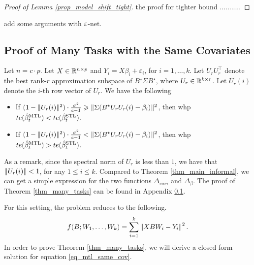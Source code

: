 \begin{proof}[Proof of Lemma \ref{prop_model_shift_tight}]
the proof for tighter bound ........... 
\end{proof}

{\cor add some arguments with ${\varepsilon}$-net.}


\subsection{Proof of Many Tasks with the Same Covariates}\label{app_proof_many_tasks}

\begin{theorem}\label{thm_many_tasks}
	Let $n = c \cdot p$.
	Let $X\in\mathbb{R}^{n\times p}$ and $Y_i = X\beta_i + \varepsilon_i$, for $i = 1,\dots,k$.
	Let $U_r U_r^{\top}$ denote the best rank-$r$ approximation subspace of $B^{\star}\Sigma B^{\star}$, where $U_r\in\mathbb{R}^{k\times r}$.
	Let $U_r(i)$ denote the $i$-th row vector of $U_r$.
	We have the following
	\begin{itemize}
		\item If $(1 - \|U_r(i)\|^2)\cdot \frac{\sigma^2}{c - 1} \geqslant \|\Sigma (B^{\star} U_r U_r(i) - \beta_i)\|^2$, then whp $te(\hat{\beta}_t^{\text{MTL}}) < te(\hat{\beta}_t^{\text{STL}})$.
		\item If $(1 - \|U_r(i)\|^2)\cdot \frac{\sigma^2}{c - 1} < \|\Sigma(B^{\star} U_r U_r(i) - \beta_i)\|^2$, then whp $te(\hat{\beta}_t^{\text{MTL}}) > te(\hat{\beta}_t^{\text{STL}})$.
	\end{itemize}
\end{theorem}
As a remark, since the spectral norm of $U_r$ is less than $1$, we have that $\|U_r(i)\| < 1$, for any $1 \le i \le k$. Compared to Theorem \ref{thm_main_informal}, we can get a simple expression for the two functions $\Delta_{vari}$ and $\Delta_{\beta}$. The proof of Theorem \ref{thm_many_tasks} can be found in Appendix \ref{app_proof_many_tasks}.




For this setting, the problem reduces to the following.
\begin{align}
	f(B; W_1, \dots, W_k) = \sum_{i=1}^k \left\| X B W_i - Y_i \right\|^2. \label{eq_mtl_same_cov}
\end{align}
In order to prove Theorem \ref{thm_many_tasks}, we will derive a closed form solution for equation \eqref{eq_mtl_same_cov}.

